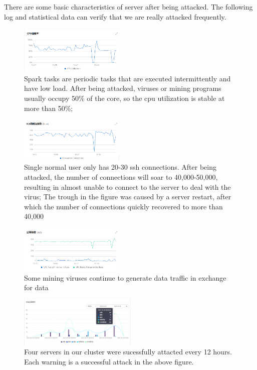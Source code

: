 There are some basic characteristics of server after being attacked. The following log and statistical data can verify that we are really attacked frequently.

\begin{figure}[H]
    \centering
    \includegraphics[width=0.45\textwidth]{./pic/continuous.png}
    \caption{Spark tasks are periodic tasks that are executed intermittently and have low load. After being attacked, viruses or mining programs usually occupy 50\% of the core, so the cpu utilization is stable at more than 50\%;}
    \label{fig:a-sec-cpu}
\end{figure}


\begin{figure}[H]
    \centering
    \includegraphics[width=0.45\textwidth]{./pic/cpu.png}
    \caption{Single normal user only has 20-30 ssh connections. After being attacked, the number of connections will soar to 40,000-50,000, resulting in almost unable to connect to the server to deal with the virus; The trough in the figure was caused by a server restart, after which the number of connections quickly recovered to more than 40,000}
    \label{fig:a-sec-ddos}
\end{figure}


\begin{figure}[H]
    \centering
    \includegraphics[width=0.45\textwidth]{./pic/ddos.png}
    \caption{Some mining viruses continue to generate data traffic in exchange for data}
    \label{fig:a-sec-bd}
\end{figure}


\begin{figure}[H]
    \centering
    \includegraphics[width=0.5\textwidth]{./pic/secsta.png}
    \caption{Four servers in our cluster were sucessfully attacted every 12 hours. Each warning is a successful attack in the above figure.}
    \label{fig:a-sec-sta}
\end{figure}

